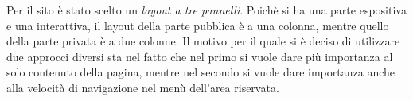 Per il sito è stato scelto un \textit{layout a tre pannelli}.
Poichè si ha una parte espositiva e una interattiva, il layout della parte pubblica è a una colonna, mentre quello della parte
privata è a due colonne. Il motivo per il quale si è deciso di utilizzare due approcci diversi sta nel fatto che nel primo si vuole dare più
importanza al solo contenuto della pagina, mentre nel secondo si vuole dare importanza anche alla velocità di navigazione nel menù dell'area
riservata.